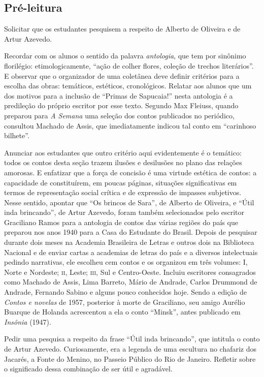 \subsection{Pré-leitura}

Solicitar que os estudantes pesquisem a respeito de Alberto de Oliveira
e de Artur Azevedo.

Recordar com os alunos o sentido da palavra \emph{antologia}, que tem
por sinônimo florilégio: etimologicamente, ``ação de colher flores,
coleção de trechos literários''. E observar que o organizador de uma
coletânea deve definir critérios para a escolha das obras: temáticos,
estéticos, cronológicos. Relatar aos alunos que um dos motivos para a
inclusão de ``Primas de Sapucaia!'' nesta antologia é a predileção do
próprio escritor por esse texto. Segundo Max Fleiuss, quando preparou
para \emph{A Semana} uma seleção dos contos publicados no
periódico, consultou Machado de Assis, que imediatamente indicou tal
conto em ``carinhoso bilhete''.

Anunciar aos estudantes que outro critério aqui evidentemente é o
temático: todos os contos desta seção trazem ilusões e desilusões no
plano das relações amorosas. E enfatizar que a força de concisão é uma
virtude estética de contos: a capacidade de constituírem, em poucas
páginas, situações significativas em termos de representação social
crítica e de expressão de impasses subjetivos. Nesse sentido, apontar
que ``Os brincos de Sara'', de Alberto de Oliveira, e ``Útil inda
brincando'', de Artur Azevedo, foram também selecionados pelo escritor
Graciliano Ramos para a antologia de contos das várias regiões do país
que preparou nos anos 1940 para a Casa do Estudante do Brasil. Depois de
pesquisar durante dois meses na Academia Brasileira de Letras e outros
dois na Biblioteca Nacional e de enviar cartas a academias de letras do
país e a diversos intelectuais pedindo narrativas, ele escolheu cem
contos e os organizou em três volumes: I, Norte e Nordeste; \textsc{ii}, Leste;
\textsc{iii}, Sul e Centro-Oeste. Incluiu escritores consagrados como Machado de
Assis, Lima Barreto, Mário de Andrade, Carlos Drummond de Andrade,
Fernando Sabino e alguns pouco conhecidos hoje. Sendo a edição de
\emph{Contos e novelas} de 1957, posterior à morte de Graciliano, seu
amigo Aurélio Buarque de Holanda acrescentou a ela o conto ``Minsk'',
antes publicado em \emph{Insônia} (1947).

Pedir uma pesquisa a respeito da frase ``Útil inda brincando'', que
intitula o conto de Artur Azevedo. Curiosamente, era a legenda de uma
escultura no chafariz dos Jacarés, a Fonte do Menino, no Passeio Público
do Rio de Janeiro. Refletir sobre o significado dessa combinação de ser
útil e agradável.


